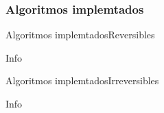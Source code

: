 %
%
%

\subsubsection{Algoritmos implemtados}

\begin{frame}{Algoritmos implemtados}{Reversibles}
  
  Info


\end{frame}

\begin{frame}{Algoritmos implemtados}{Irreversibles}
  
  Info


\end{frame}
